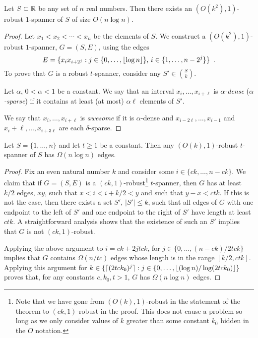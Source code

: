 \documentclass{patmorin}
\begin{document}
\begin{thm}
Let $S\subset \mathbb{R}$ be any set of $n$ real numbers.  Then there exists an
$(O(k^2),1)$-robust $1$-spanner of $S$ of size $O(n\log n)$.
\end{thm}

\begin{proof}
Let $x_1<x_2<\cdots<x_n$ be the elements of $S$.  We construct a
$(O(k^2),1)$-robust $1$-spanner, $G=(S,E)$, using the edges
\[
    E = \{x_ix_{i+2^j} : j\in\{0,\ldots,{\lfloor \log n \rfloor}\},\, i\in\{1,\ldots,n-2^j\} \} \enspace .
\] 
To  prove that $G$ is a robust $t$-spanner, consider any
$S'\in\binom{S}{k}$.

Let $\alpha$, $0< \alpha<1$ be a constant.  We say that an interval
$x_i,\ldots,x_{i+\ell}$ is \emph{$\alpha$-dense} (\emph{$\alpha$-sparse})
if it contains at least (at most) $\alpha\ell$ elements of $S'$.

We say that $x_i,\ldots,x_{i+\ell}$ is \emph{awesome} if
it is $\alpha$-dense and $x_{i-2\ell},\ldots,x_{i-1}$ and
$x_i+\ell,\ldots,x_{i+3\ell}$ are each $\delta$-sparse.


\end{proof}




\begin{thm}
Let $S=\{1,\ldots,n\}$ and let $t\ge 1$ be a constant.  Then any
$(O(k),1)$-robust $t$-spanner of $S$ has $\Omega(n\log n)$ edges.
\end{thm}

\begin{proof}
Fix an even natural number $k$ and consider some $i\in\{ck,\ldots,n-ck\}$.
We claim that if $G=(S,E)$ is a $(ck,1)$-robust\footnote{Note that we
have gone from $(O(k),1)$-robust in the statement of the theorem to
$(ck,1)$-robust in the proof.  This does not cause a problem so long
as we only consider values of $k$ greater than some constant $k_0$
hidden in the $O$ notation.} $t$-spanner, then $G$ has at least $k/2$
edges, $xy$, such that $x < i < i+k/2 < y$ and such that $y-x < ctk$.
If this is not the case, then there exists a set $S'$, $|S'|\le k$,
such that all edges of $G$ with one endpoint to the left of $S'$
and one endpoint to the right of $S'$ have length at least $ctk$.
A straightforward analysis shows that the existence of such an $S'$
implies that $G$ is not $(ck,1)$-robust.

Applying the above argument to $i=ck+2jtck$, for
$j\in\{0,\ldots,(n-ck)/2tck\}$ implies that $G$ contains $\Omega(n/tc)$
edges whose length is in the range $[k/2,ctk]$.  Applying this
argument for $k\in\{{\lceil (2tck_0)^{j} \rceil} : j\in\{0,\ldots,{\lfloor (\log
n)/\log(2tck_0) \rfloor}\}$ proves that, for any constants $c,k_0,t>1$, $G$
has $\Omega(n\log n)$ edges.
\end{proof}
\end{document}
